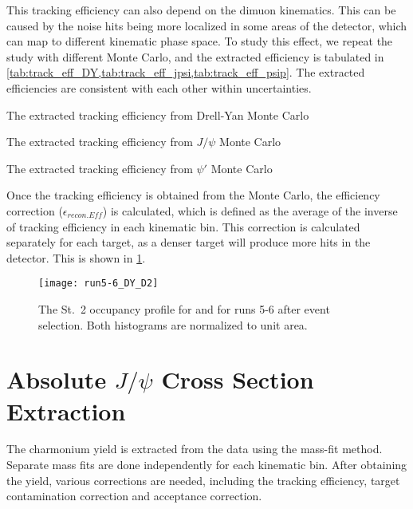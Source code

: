 \documentclass[../main.tex]{subfiles}
\begin{document}
This tracking efficiency can also depend on the dimuon kinematics. This can be caused
by the noise hits being more localized in some areas of the detector, which can map to
different kinematic phase space. To study this effect, we repeat the study with different
Monte Carlo, and the extracted efficiency is tabulated in \cref{tab:track_eff_DY,tab:track_eff_jpsi,tab:track_eff_psip}.
The extracted efficiencies are consistent with each other within uncertainties.

\begin{table}
	\centering
	\caption{The extracted tracking efficiency from Drell-Yan Monte Carlo}
	\label{tab:track_eff_DY}
	
\end{table}
\begin{table}
	\centering
	\caption{The extracted tracking efficiency from $J/\psi$  Monte Carlo}
	\label{tab:track_eff_jpsi}
	
\end{table}
\begin{table}
	\centering
	\caption{The extracted tracking efficiency from $\psi'$ Monte Carlo}
	\label{tab:track_eff_psip}
	
\end{table}

Once the tracking efficiency is obtained from the Monte Carlo, the efficiency correction ($\epsilon_{recon.Eff}$)
is calculated, which is defined as the average of the inverse of tracking efficiency in each
kinematic bin. This correction is calculated separately for each target, as a denser target
will produce more hits in the detector. This is shown in \cref{fig:target_D2}.

\begin{figure}[h!]
	\centering
	\texttt{[image: run5-6\_DY\_D2]}
	\caption{The St.~2 occupancy profile for  and  for runs 5-6 after event selection. Both histograms are normalized to unit area.
	}
	\label{fig:target_D2}
\end{figure}


\section{Absolute \texorpdfstring{$J/\psi$}{J/psi} Cross Section Extraction}
\label{sec:cs_analysis}
The charmonium yield is extracted from the data using the mass-fit method.
Separate mass fits are done independently for each kinematic bin. After obtaining
the yield, various corrections are needed, including the tracking efficiency, target
contamination correction and acceptance correction.
\end{document}
